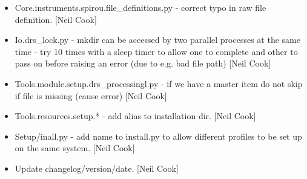 \documentclass[a4paper,10pt,english]{report}
\begin{document}
\begin{itemize}
\item {} 
Core.instruments.spirou.file\_definitions.py - correct typo in raw file
definition. {[}Neil Cook{]}

\item {} 
Io.drs\_lock.py - mkdir can be accessed by two parallel processes at
the same time - try 10 times with a sleep timer to allow one to
complete and other to pass on before raising an error (due to e.g. bad
file path) {[}Neil Cook{]}

\item {} 
Tools.module.setup.drs\_processingl.py - if we have a master item do
not skip if file is missing (cause error) {[}Neil Cook{]}

\item {} 
Tools.resources.setup.* - add alias to installation dir. {[}Neil Cook{]}

\item {} 
Setup/inall.py - add \textendash{}name to install.py to allow different profiles
to be set up on the same system. {[}Neil Cook{]}

\item {} 
Update changelog/version/date. {[}Neil Cook{]}

\end{itemize}
\end{document}
